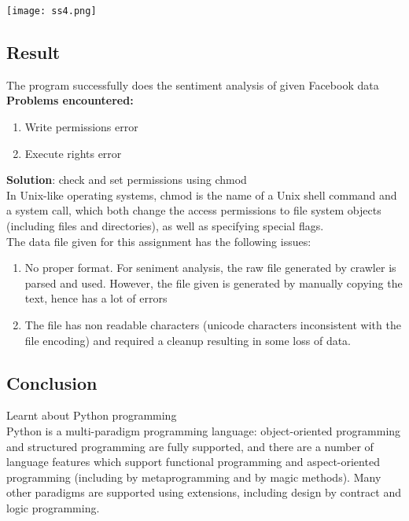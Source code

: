 \documentclass[paper=a4, fontsize=11pt]{scrartcl} %
\numberwithin{equation}{section} %
\numberwithin{figure}{section} %
\numberwithin{table}{section} %
\begin{document}
\texttt{[image: ss4.png]}\\


\subsection{Result}

The program successfully does the sentiment analysis of given Facebook data\\
\textbf{Problems encountered:}
\begin{enumerate}
\item Write permissions error
\item Execute rights error
\end{enumerate}

\textbf{Solution}: check and set permissions using chmod\\
In Unix-like operating systems, chmod is the name of a Unix shell command and a system call, which both change the access permissions to file system objects (including files and directories), as well as specifying special flags.\\

The data file given for this assignment has the following issues:
\begin{enumerate}
\item No proper format. For seniment analysis, the raw file generated by crawler is parsed and used. However, the file given is generated by manually copying the text, hence has a lot of errors
\item The file has non readable characters (unicode characters inconsistent with the file encoding) and required a cleanup resulting in some loss of data.
\end{enumerate}

\subsection{Conclusion}
Learnt about Python programming\\

Python is a multi-paradigm programming language: object-oriented programming and structured programming are fully supported, and there are a number of language features which support functional programming and aspect-oriented programming (including by metaprogramming and by magic methods). Many other paradigms are supported using extensions, including design by contract and logic programming.
\end{document}
